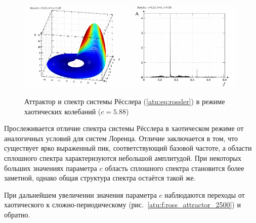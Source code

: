 \begin{figure}[ht!]
\begin{center}
  \includegraphics[width=0.49\textwidth]{p/cha/ross/ross0-p_xyz_c=05x88.png}
  \hfill
  \includegraphics[width=0.49\textwidth]{p/cha/ross/ross_f-p_f_c=05x88.png}
\end{center}
  \caption{Аттрактор и спектр системы Рёсслера (\ref{atu:eq:rossler}) в режиме хаотических колебаний ($c=5.88$)}
\label{atu:f:ross_attractor_0588}
\end{figure}


Прослеживается отличие спектра системы Рёсслера в хаотическом режиме
от аналогичных условий для систем Лоренца. Отличие заключается в том, что
существует ярко выраженный пик, соответствующий базовой частоте,
а области сплошного спектра характеризуются небольшой амплитудой.
При некоторых больших значениях параметра $c$
область сплошного спектра становится более заметной,
однако общая структура спектра остаётся такой же.


При дальнейшем увеличении значения параметра \(c\)
наблюдаются переходы от хаотического к сложно-периодическому
(рис.~\ref{atu:f:ross_attractor_2500})
и  обратно.

